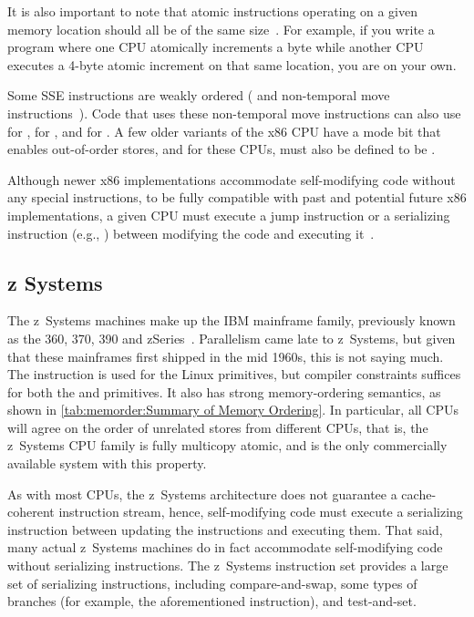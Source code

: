 It is also important to note that atomic instructions operating
on a given memory location should all be of the same
size~\cite[Section 8.1.2.2]{Intel64IA32v3A2016}.
For example, if you write a program where one CPU atomically increments
a byte while another CPU executes a 4-byte atomic increment on
that same location, you are on your own.

Some SSE instructions are weakly ordered (
and non-temporal move instructions~\cite{IntelXeonV2b-96a}).
Code that uses these non-temporal move instructions
can also use  for ,
 for , and  for .
A few older variants of the x86 CPU have a mode bit that enables out-of-order
stores, and for these CPUs,  must also be defined to
be .

Although newer x86 implementations accommodate self-modifying code
without any special instructions, to be fully compatible with
past and potential future x86 implementations, a given CPU must
execute a jump instruction or a serializing instruction (e.g., )
between modifying the code and executing
it~\cite[Section 8.1.3]{Intel64IA32v3A2011}.

\subsection{z Systems}

The z~Systems machines make up the IBM mainframe family, previously
known as the 360, 370, 390 and zSeries~\cite{IBMzSeries04a}.
Parallelism came late to z~Systems, but given that these mainframes first
shipped in the mid 1960s, this is not saying much.
The  instruction is used for the Linux  primitives,
but compiler constraints suffices for both the
 and  primitives.
It also has strong memory-ordering semantics, as shown in
\cref{tab:memorder:Summary of Memory Ordering}.
In particular, all CPUs will agree on the order of unrelated stores from
different CPUs, that is, the z~Systems CPU family is fully multicopy
atomic, and is the only commercially available system with this property.

As with most CPUs, the z~Systems architecture does not guarantee a
cache-coherent instruction stream, hence,
self-modifying code must execute a serializing instruction between updating
the instructions and executing them.
That said, many actual z~Systems machines do in fact accommodate self-modifying
code without serializing instructions.
The z~Systems instruction set provides a large set of serializing instructions,
including compare-and-swap, some types of branches (for example, the
aforementioned  instruction), and test-and-set.

